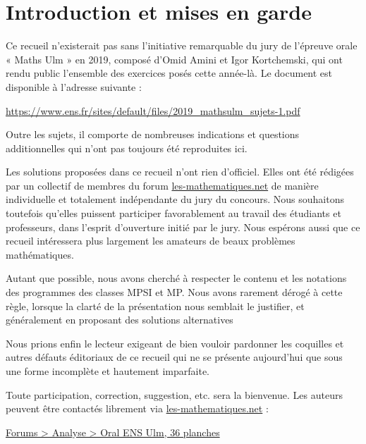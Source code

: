 \chapter*{Introduction et mises en garde}
 
Ce recueil n'existerait pas sans l'initiative remarquable du jury de l'épreuve orale « Maths Ulm » en 2019, composé d'Omid Amini et Igor Kortchemski, qui ont rendu public l'ensemble des exercices posés cette année-là.
Le document est disponible à l'adresse suivante :
\begin{center}
    \url{https://www.ens.fr/sites/default/files/2019_mathsulm_sujets-1.pdf}
\end{center}
Outre les sujets, il comporte de nombreuses indications et questions additionnelles qui n'ont pas toujours été reproduites ici.

\bigbreak

Les solutions proposées dans ce recueil n'ont rien d'officiel. Elles ont été rédigées par un collectif de membres du forum \href{http://www.les-mathematiques.net/phorum/}{les-mathematiques.net} de manière individuelle et totalement indépendante du jury du concours. Nous souhaitons toutefois qu'elles puissent participer favorablement au travail des étudiants et professeurs, dans l'esprit d'ouverture initié par le jury. Nous espérons aussi que ce recueil intéressera plus largement les amateurs de beaux problèmes mathématiques.

\bigbreak

Autant que possible, nous avons cherché à respecter le contenu et les notations des programmes des classes MPSI et MP. Nous avons rarement dérogé à cette règle, lorsque la clarté de la présentation nous semblait le justifier, et généralement en proposant des solutions alternatives

\bigbreak

Nous prions enfin le lecteur exigeant de bien vouloir pardonner les coquilles et autres défauts éditoriaux de ce recueil qui ne se présente aujourd'hui que sous une forme incomplète et hautement imparfaite. 

\bigbreak

\noindent
Toute participation, correction, suggestion, etc. sera la bienvenue.
Les auteurs peuvent être contactés librement via  
\href{http://www.les-mathematiques.net/phorum/}{les-mathematiques.net}  :
\begin{center}
\href{http://www.les-mathematiques.net/phorum/read.php?4,1841908}{Forums > Analyse > Oral ENS Ulm, 36 planches}
\end{center}